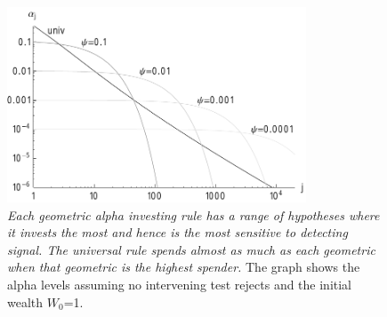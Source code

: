 \documentclass[12pt]{article}
\begin{document}
 \begin{figure}
 \caption{ \label{fig:rules} { \sl Each geometric alpha investing rule has a range of hypotheses where it invests the most and hence is the most sensitive to detecting signal.  The universal rule spends almost as much as each geometric  when that
geometric is the highest spender.} The graph shows the alpha levels assuming no intervening test rejects and the initial wealth $W_0$=1. }

 \centerline{
 \vspace{0.1in}
 \includegraphics[width=3.5in]{figures/rules} }
 \vspace{0.2in}
 \end{figure}
\end{document}
